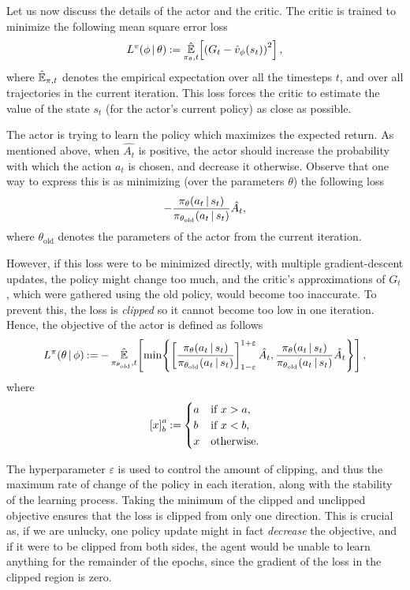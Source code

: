 Let us now discuss the details of the actor and the critic.
The critic is trained to minimize the following mean square error loss \begin{equation}
	\label{eq:ppoloss}
	\losscritic \deq \fceb {\EE_{\actor,t}}{\left( \return_t - \fce{\critic}{s_t} \right)^2},
\end{equation}
where $ \EE_{\pi,t} $ denotes the empirical expectation over all the timesteps $ t $, and over all trajectories in the current iteration.
This loss forces the critic to estimate the value of the state $ s_t $ (for the actor's current policy) as close as possible.

The actor is trying to learn the policy which maximizes the expected return.
As mentioned above, when $ \hat{A_t} $ is positive, the actor should increase the probability with which the action $ a_t $ is chosen, and decrease it otherwise.
Observe that one way to express this is as minimizing (over the parameters $ \theta $) the following loss \[
	-\frac{\fce{\actor}{a_t \suchthat s_t}}{\fce{\actor[\theta_{\text{old}}]}{a_t \suchthat s_t}} \hat{A_t},
\]
where $ \theta_{\text{old}} $ denotes the parameters of the actor from the current iteration.

However, if this loss were to be minimized directly, with multiple gradient-descent updates, the policy might change too much, and the critic's approximations of $ G_t $, which were gathered using the old policy, would become too inaccurate.
To prevent this, the loss is \emph{clipped} so it cannot become too low in one iteration.
Hence, the objective of the actor is defined as follows \begin{align*}
	\lossactor &\deq -\fceb {\EE_{\actor[\theta_{\text{old}}],t}}{\fcec\min{\left[ \frac{\fce\actor{a_t \suchthat s_t}}{\fce{\actor[\theta_{\text{old}}]}{a_t \suchthat s_t}} \right]^{1+\varepsilon}_{1-\varepsilon} \hat{A_t}, \frac{\fce\actor{a_t \suchthat s_t}}{\fce{\actor[\theta_{\text{old}}]}{a_t \suchthat s_t}} \hat{A_t}}}, \\
\end{align*}
where
\[
	\left[ x \right]^a_b \deq \begin{cases}
		a & \text{if $ x > a $,} \\
		b & \text{if $ x < b $,} \\
		x & \text{otherwise.}
	\end{cases}
\]

The hyperparameter $ \varepsilon $ is used to control the amount of clipping, and thus the maximum rate of change of the policy in each iteration, along with the stability of the learning process.
Taking the minimum of the clipped and unclipped objective ensures that the loss is clipped from only one direction.
This is crucial as, if we are unlucky, one policy update might in fact \emph{decrease} the objective, and if it were to be clipped from both sides, the agent would be unable to learn anything for the remainder of the epochs, since the gradient of the loss in the clipped region is zero.

